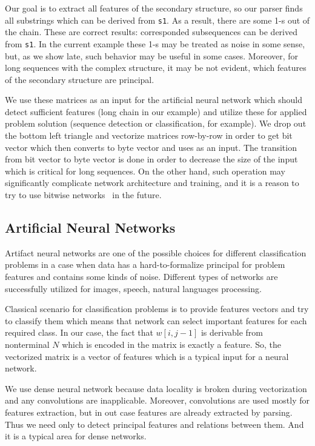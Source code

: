 \documentclass[a4paper,twoside]{article}
\begin{document}
Our goal is to extract all features of the secondary structure, so our parser finds all substrings which can be derived from \verb|s1|.
As a result, there are some 1-s out of the chain.
These are correct results: corresponded subsequences can be derived from \verb|s1|. 
In the current example these 1-s may be treated as noise in some sense, but, as we show late, such behavior may be useful in some cases.
Moreover, for long sequences with the complex structure, it may be not evident, which features of the secondary structure are principal.

We use these matrices as an input for the artificial neural network which should detect sufficient features (long chain in our example) and utilize these for applied problem solution (sequence detection or classification, for example).
We drop out the bottom left triangle and vectorize matrices row-by-row in order to get bit vector which then converts to byte vector and uses as an input.
The transition from bit vector to byte vector is done in order to decrease the size of the input which is critical for long sequences. 
On the other hand, such operation may significantly complicate network architecture and training, and it is a reason to try to use bitwise networks~\cite{DBLP:journals:corr:KimS16} in the future.  

\subsection{Artificial Neural Networks}

\noindent Artifact neural networks are one of the possible choices for different classification problems in a case when data has a hard-to-formalize principal for problem features and contains some kinds of noise. Different types of networks are successfully utilized for images, speech, natural languages processing.

Classical scenario for classification problems is to provide features vectors and try to classify them which means that network can select important features for each required class.
In our case, the fact that $w[i,j-1]$ is derivable from nonterminal $N$ which is encoded in the matrix is exactly a feature.
So, the vectorized matrix is a vector of features which is a typical input for a neural network.

We use dense neural network because data locality is broken during vectorization and any convolutions are inapplicable.
Moreover, convolutions are used mostly for features extraction, but in out case features are already extracted by parsing.
Thus we need only to detect principal features and relations between them.
And it is a typical area for dense networks.
\end{document}
